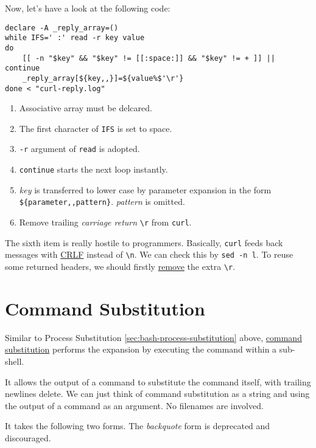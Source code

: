 Now, let's have a look at the following code:

\begin{lstlisting}[caption={curl CRLF},label={lst:curl-crlf}]
declare -A _reply_array=()
while IFS=' :' read -r key value
do
    [[ -n "$key" && "$key" != [[:space:]] && "$key" != + ]] || continue
    _reply_array[${key,,}]=${value%$'\r'}
done < "curl-reply.log"
\end{lstlisting}

\begin{enumerate}
\item Associative array must be delcared.
\item The first character of \lstinline|IFS| is set to space.
\item \lstinline|-r| argument of \lstinline|read| is adopted.
\item \lstinline|continue| starts the next loop instantly.
\item \textit{key} is transferred to lower case by parameter
  expansion in the form
  \lstinline|${parameter,,pattern}|. \textit{pattern} is omitted.
\item Remove trailing \textit{carriage return} \lstinline|\r| from
  \lstinline|curl|.
\end{enumerate}

The sixth item is really hostile to programmers. Basically,
\lstinline|curl| feeds back messages with
\href{https://stackoverflow.com/a/30957952/2336707}{CRLF}
instead of \lstinline|\n|. We can check this by
\lstinline|sed -n l|. To reuse some returned headers, we should
firstly
\href{https://stackoverflow.com/a/35019553/2336707}{remove} the
extra \lstinline|\r|.

\section{Command Substitution}
\label{sec:bash-command-substitution}

Similar to Process Substitution
\ref{sec:bash-process-substitution} above,
\href{https://www.gnu.org/software/bash/manual/bash.html#Command-Substitution}{command
  substitution} performs the expansion by executing the command
within a sub-shell.

It allows the output of a command to substitute the command
itself, with trailing newlines delete. We can just think of
command substitution as a string and using the output of a command
as an argument. No filenames are involved.

It takes the following two
forms. The \textit{backquote} form is deprecated and discouraged.

